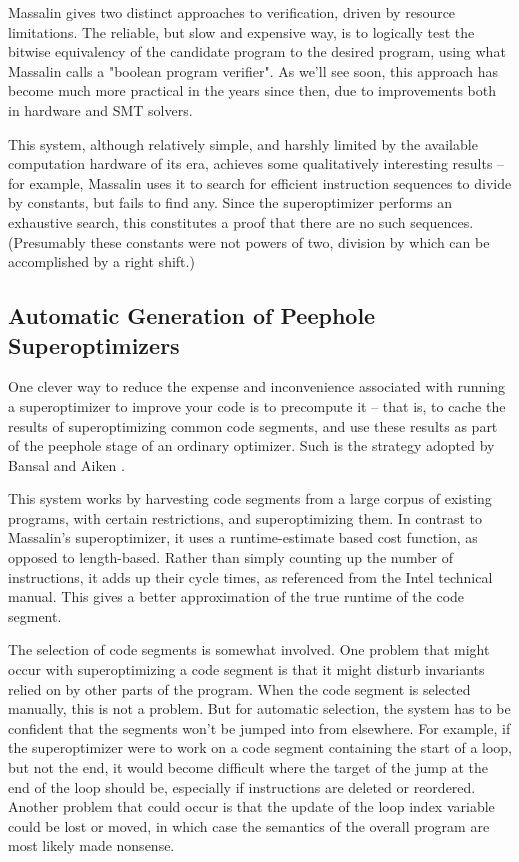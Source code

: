 \documentclass[12pt,twoside]{reedthesis}
\begin{document}
            Massalin gives two distinct approaches to verification, driven by resource limitations.
            The reliable, but slow and expensive way, is to logically test the bitwise equivalency of the candidate program to the desired program, using what Massalin calls a "boolean program verifier".
            As we'll see soon, this approach has become much more practical in the years since then, due to improvements both in hardware and SMT solvers. 
                
            This system, although relatively simple, and harshly limited by the available computation hardware of its era, achieves some qualitatively interesting results -- for example, Massalin uses it to search for efficient instruction sequences to divide by constants, but fails to find any.
            Since the superoptimizer performs an exhaustive search, this constitutes a proof that there are no such sequences. (Presumably these constants were not powers of two, division by which can be accomplished by a right shift.)

        \subsection{Automatic Generation of Peephole Superoptimizers}
            One clever way to reduce the expense and inconvenience associated with running a superoptimizer to improve your code is to precompute it
            -- that is, to cache the results of superoptimizing common code segments, and use these results as part of the peephole stage of an ordinary optimizer.
            Such is the strategy adopted by Bansal and Aiken \cite{bansal2006peephole}.
            
            This system works by harvesting code segments from a large corpus of existing programs, with certain restrictions, and superoptimizing them. 
            In contrast to Massalin's superoptimizer, it uses a runtime-estimate based cost function, as opposed to length-based.
            Rather than simply counting up the number of instructions, it adds up their cycle times, as referenced from the Intel technical manual.
            This gives a better approximation of the true runtime of the code segment.
            
            The selection of code segments is somewhat involved.
            One problem that might occur with superoptimizing a code segment is that it might disturb invariants relied on by other parts of the program.
            When the code segment is selected manually, this is not a problem.
            But for automatic selection, the system has to be confident that the segments won't be jumped into from elsewhere.
            For example, if the superoptimizer were to work on a code segment containing the start of a loop, but not the end, it would become difficult where the target of the jump at the end of the loop should be, especially if instructions are deleted or reordered.
            Another problem that could occur is that the update of the loop index variable could be lost or moved, in which case the semantics of the overall program are most likely made nonsense.
            
\end{document}
